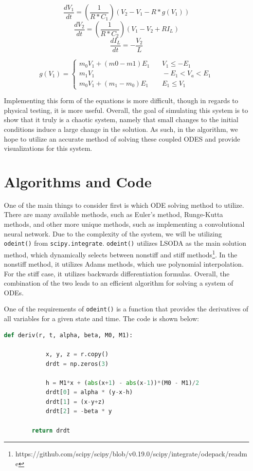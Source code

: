 \documentclass{article}
\begin{document}
    $$\frac{dV_1}{dt} = \left(\frac{1}{R*C_1}\right)(V_2 - V_1 - R*g(V_1))$$
    $$\frac{dV_2}{dt} = \left(\frac{1}{R*C_2}\right)(V_1 - V_2 + RI_L)$$
    $$\frac{dI_L}{dt} = -\frac{V_2}{L}$$
    
    \[g(V_1) = 
        \begin{cases} 
          m_0V_1 + (m0 - m1)E_1 &\quad V_1\leq -E_1 \\
          m_1V_1 &\quad -E_1 < V_a < E_1\\
          m_0V_1 + (m_1 - m_0)E_1 &\quad E_1\leq V_1 
       \end{cases}
    \]
    \medskip
    
    Implementing this form of the equations is more difficult, though in regards to physical testing, it is more useful. Overall, the goal of simulating this system is to show that it truly is a chaotic system, namely that small changes to the initial conditions induce a large change in the solution. As such, in the algorithm, we hope to utilize an accurate method of solving these coupled ODES and provide visualizations for this system.

\section{Algorithms and Code}

    One of the main things to consider first is which ODE solving method to utilize. There are many available methods, such as Euler's method, Runge-Kutta methods, and other more unique methods, such as implementing a convolutional neural network. Due to the complexity of the system, we will be utilizing \verb|odeint()| from \verb|scipy.integrate|. \verb|odeint()| utilizes LSODA as the main solution method, which dynamically selects between nonstiff and stiff methods\footnote{https://github.com/scipy/scipy/blob/v0.19.0/scipy/integrate/odepack/readme}. In the nonstiff method, it utilizes Adams methods, which use polynomial interpolation. For the stiff case, it utilizes backwards differentiation formulas. Overall, the combination of the two leads to an efficient algorithm for solving a system of ODEs. 
    
    One of the requirements of \verb|odeint()| is a function that provides the derivatives of all variables for a given state and time. The code is shown below:
    \newpage
    
    \begin{lstlisting}[language=Python]
        def deriv(r, t, alpha, beta, M0, M1):
        
            x, y, z = r.copy()
            drdt = np.zeros(3)
            
            h = M1*x + (abs(x+1) - abs(x-1))*(M0 - M1)/2
            drdt[0] = alpha * (y-x-h)
            drdt[1] = (x-y+z)
            drdt[2] = -beta * y
        
        return drdt
    \end{lstlisting}
    
\end{document}
